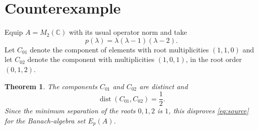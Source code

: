\documentclass[11pt]{article}
\newtheorem{theorem}{Theorem}
\newcommand{\C}{\mathbb C}
\newcommand{\Mtwo}{M_2(\C)}
\newcommand{\dist}{\operatorname{dist}}
\begin{document}
\section{Counterexample}

Equip $A=\Mtwo$ with its usual operator norm and take
\[
 p(\lambda)=\lambda(\lambda-1)(\lambda-2).
\]
Let $C_{01}$ denote the component of elements with root multiplicities
$(1,1,0)$ and let $C_{02}$ denote the component with multiplicities
$(1,0,1)$, in the root order $(0,1,2)$.

\begin{theorem}\label{thm:main}
The components $C_{01}$ and $C_{02}$ are distinct and
\[
 \dist(C_{01},C_{02})=\frac12.
\]
Since the minimum separation of the roots $0,1,2$ is $1$, this disproves
\eqref{eq:source} for the Banach-algebra set $E_p(A)$.
\end{theorem}
\end{document}

